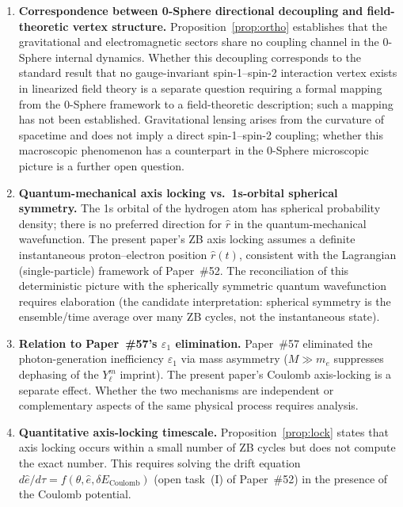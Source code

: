 \documentclass[%
 reprint, amsmath,amssymb, aps, prd, ]{revtex4-2}
\numberwithin{equation}{section}
\newcommand{\iphase}{\theta}
\begin{document}
\begin{enumerate}[label=(\Alph*), leftmargin=2em]
\item \textbf{Correspondence between 0-Sphere directional decoupling and field-theoretic vertex structure.}
Proposition~\ref{prop:ortho} establishes that the gravitational and electromagnetic sectors share no coupling channel in the 0-Sphere internal dynamics.
Whether this decoupling corresponds to the standard result that no gauge-invariant spin-1--spin-2 interaction vertex exists in linearized field theory is a separate question requiring a formal mapping from the 0-Sphere framework to a field-theoretic description; such a mapping has not been established.
Gravitational lensing arises from the curvature of spacetime and does not imply a direct spin-1--spin-2 coupling; whether this macroscopic phenomenon has a counterpart in the 0-Sphere microscopic picture is a further open question.

\item \textbf{Quantum-mechanical axis locking vs.\ 1s-orbital spherical symmetry.}
The 1s orbital of the hydrogen atom has spherical probability density; there is no preferred direction for $\hat{r}$ in the quantum-mechanical wavefunction. The present paper's ZB axis locking assumes a definite instantaneous proton--electron position $\hat{r}(t)$, consistent with the Lagrangian (single-particle) framework of Paper~\#52. The reconciliation of this deterministic picture with the spherically symmetric quantum wavefunction requires elaboration (the candidate interpretation: spherical symmetry is the ensemble/time average over many ZB cycles, not the instantaneous state).

\item \textbf{Relation to Paper~\#57's $\varepsilon_1$ elimination.}
Paper~\#57 eliminated the photon-generation inefficiency $\varepsilon_1$ via mass asymmetry ($M \gg m_e$ suppresses dephasing of the $Y_\ell^m$ imprint). The present paper's Coulomb axis-locking is a separate effect. Whether the two mechanisms are independent or complementary aspects of the same physical process requires analysis.

\item \textbf{Quantitative axis-locking timescale.}
Proposition~\ref{prop:lock} states that axis locking occurs within a small number of ZB cycles but does not compute the exact number. This requires solving the drift equation $d\hat{e}/d\tau = f(\iphase, \hat{e}, \delta E_\mathrm{Coulomb})$ (open task~(I) of Paper~\#52) in the presence of the Coulomb potential.

\end{enumerate}
\end{document}
